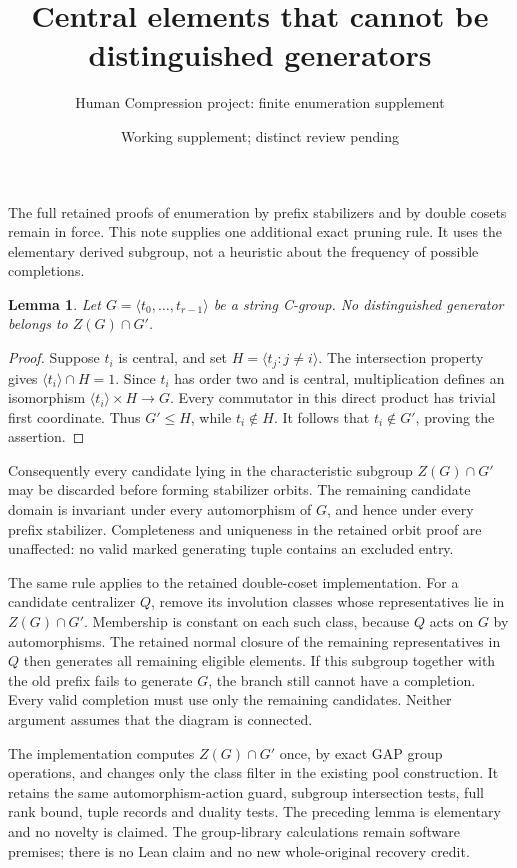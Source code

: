 \documentclass[11pt,a4paper]{article}
\title{Central elements that cannot be distinguished generators}
\author{Human Compression project: finite enumeration supplement}
\date{Working supplement; distinct review pending}
\newtheorem{lemma}{Lemma}
\begin{document}
\maketitle
The full retained proofs of enumeration by prefix stabilizers and by
double cosets remain in force. This note supplies one additional exact
pruning rule. It uses the elementary derived subgroup, not a heuristic
about the frequency of possible completions.

\begin{lemma}
Let $G=\langle t_0,\ldots,t_{r-1}\rangle$ be a string C-group.
No distinguished generator belongs to $Z(G)\cap G'$.
\end{lemma}
\begin{proof}
Suppose $t_i$ is central, and set
$H=\langle t_j:j\ne i\rangle$. The intersection property gives
$\langle t_i\rangle\cap H=1$. Since $t_i$ has order two and is
central, multiplication defines an isomorphism
$\langle t_i\rangle\times H\longrightarrow G$.
Every commutator in this direct product has trivial first coordinate.
Thus $G'\le H$, while $t_i\notin H$. It follows that
$t_i\notin G'$, proving the assertion.
\end{proof}

Consequently every candidate lying in the characteristic subgroup
$Z(G)\cap G'$ may be discarded before forming stabilizer orbits.
The remaining candidate domain is invariant under every automorphism
of $G$, and hence under every prefix stabilizer. Completeness and
uniqueness in the retained orbit proof are unaffected: no valid
marked generating tuple contains an excluded entry.

The same rule applies to the retained double-coset implementation.
For a candidate centralizer $Q$, remove its involution classes whose
representatives lie in $Z(G)\cap G'$. Membership is constant on each
such class, because $Q$ acts on $G$ by automorphisms. The retained
normal closure of the remaining representatives in $Q$ then generates
all remaining eligible elements. If this subgroup together with the
old prefix fails to generate $G$, the branch still cannot have a
completion. Every valid completion must use only the remaining
candidates. Neither argument assumes that the diagram is connected.

The implementation computes $Z(G)\cap G'$ once, by exact GAP group
operations, and changes only the class filter in the existing pool
construction. It retains the same automorphism-action guard, subgroup
intersection tests, full rank bound, tuple records and duality tests.
The preceding lemma is elementary and no novelty is claimed.
The group-library calculations remain software premises; there is no
Lean claim and no new whole-original recovery credit.
\end{document}
